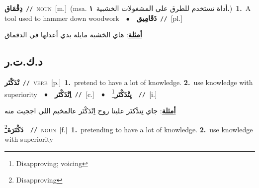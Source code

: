 \documentclass[10pt,a4paper,twoside]{article} %
\begin{document}
\begin{multicols}{2}
{\setlength\topsep{0pt}\textbf{\foreignlanguage{arabic}{دِقْمَاق}}\ {\color{gray}\texttt{//}\color{black}}\ \textsc{noun}\ [m.]\ \color{gray}(msa. \foreignlanguage{arabic}{أداة تستخدم للطرق على المشغولات الخشبية}~\foreignlanguage{arabic}{\textbf{١.}})\color{black}\ \textbf{1.}~A tool used to hammer down woodwork\ \ $\bullet$\ \ \setlength\topsep{0pt}\textbf{\foreignlanguage{arabic}{دَقَامِيق}}\ {\color{gray}\texttt{//}\color{black}}\ [pl.]\  \begin{flushright}\color{gray}\foreignlanguage{arabic}{\textbf{\underline{\foreignlanguage{arabic}{أمثلة}}}: هاي الخشبة مايلة بدي أعدلها في الدقماق}\end{flushright}\color{black}} \vspace{2mm}

\vspace{-3mm}
\subsection*{\color{blue}\foreignlanguage{arabic}{د.ك.ت.ر}\color{blue}{ (ntws)}} 

{\setlength\topsep{0pt}\textbf{\foreignlanguage{arabic}{تْدَكْتَر}}\ {\color{gray}\texttt{//}\color{black}}\ \textsc{verb}\ [p.]\ \textbf{1.}~pretend to have a lot of knowledge.  \textbf{2.}~use knowledge with superiority\ \ $\bullet$\ \ \setlength\topsep{0pt}\textbf{\foreignlanguage{arabic}{اِتْدَكْتَر}}\ {\color{gray}\texttt{//}\color{black}}\ [c.]\ \ $\bullet$\ \ \setlength\topsep{0pt}\textbf{\foreignlanguage{arabic}{يِتْدَكْتَر}}\footnote{Disapproving; voicing}\ \ {\color{gray}\texttt{//}\color{black}}\ [i.]\  \begin{flushright}\color{gray}\foreignlanguage{arabic}{\textbf{\underline{\foreignlanguage{arabic}{أمثلة}}}: جاي تِتدَّكتَر علينا روح اِتْدَكْتَر عالمخيم اللي اججيت منه}\end{flushright}\color{black}} \vspace{2mm}

{\setlength\topsep{0pt}\textbf{\foreignlanguage{arabic}{دَكْتَرَة}}\footnote{Disapproving}\ \ {\color{gray}\texttt{//}\color{black}}\ \textsc{noun}\ [f.]\ \textbf{1.}~pretending to have a lot of knowledge.  \textbf{2.}~use knowledge with superiority\ } \vspace{2mm}


\end{multicols}
\end{document}
